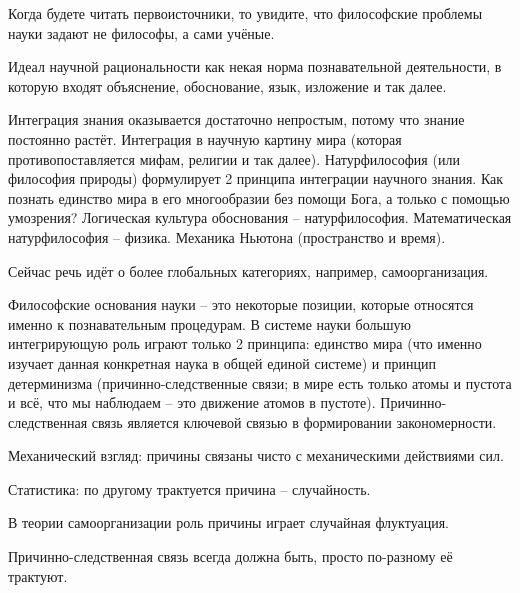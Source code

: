 \documentclass[main.tex]{subfiles}
\begin{document}
Когда будете читать первоисточники, то увидите, что философские проблемы науки задают не философы, а сами учёные.

Идеал научной рациональности как некая норма познавательной деятельности, в которую входят объяснение, обоснование, язык, изложение и так далее.



Интеграция знания оказывается достаточно непростым, потому что знание постоянно растёт.
Интеграция в научную картину мира (которая противопоставляется мифам, религии и так далее).
Натурфилософия (или философия природы) формулирует 2 принципа интеграции научного знания.
Как познать единство мира в его многообразии без помощи Бога, а только с помощью умозрения?
Логическая культура обоснования -- натурфилософия.
Математическая натурфилософия -- физика.
Механика Ньютона (пространство и время).

Сейчас речь идёт о более глобальных категориях, например, самоорганизация.




Философские основания науки -- это некоторые позиции, которые относятся именно к познавательным процедурам.
В системе науки большую интегрирующую роль играют только 2 принципа: единство мира (что именно изучает данная конкретная наука в общей единой системе) и принцип детерминизма (причинно-следственные связи; в мире есть только атомы и пустота и всё, что мы наблюдаем -- это движение атомов в пустоте).
Причинно-следственная связь является ключевой связью в формировании закономерности.

Механический взгляд: причины связаны чисто с механическими действиями сил.

Статистика: по другому трактуется причина -- случайность.

В теории самоорганизации роль причины играет случайная флуктуация.

Причинно-следственная связь всегда должна быть, просто по-разному её трактуют.



\end{document}
